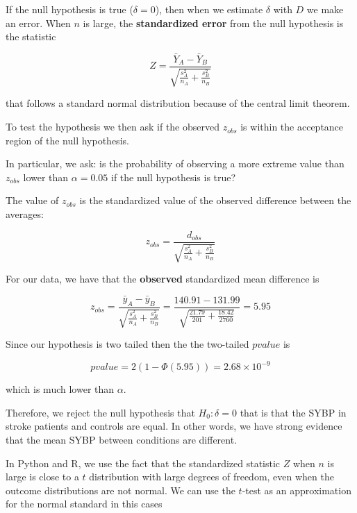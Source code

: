 \documentclass[
]{book}
\begin{document}
If the null hypothesis is true (\(\delta=0\)), then when we estimate \(\delta\) with \(D\) we make an error. When \(n\) is large, the \textbf{standardized error} from the null hypothesis is the statistic

\[Z=\frac{\bar{Y}_A-\bar{Y}_B}{\sqrt{\frac{s_A^2}{n_A}+\frac{s^2_B}{n_B}}}\]

that follows a standard normal distribution because of the central limit theorem.

To test the hypothesis we then ask if the observed \(z_{obs}\) is within the acceptance region of the null hypothesis.

In particular, we ask: is the probability of observing a more extreme value than \(z_{obs}\) lower than \(\alpha=0.05\) if the null hypothesis is true?

The value of \(z_{obs}\) is the standardized value of the observed difference between the averages:

\[z_{obs}=\frac{d_{obs}}{\sqrt{\frac{s_A^2}{n_A}+\frac{s^2_B}{n_B}}}\]

For our data, we have that the \textbf{observed} standardized mean difference is

\[z_{obs}=\frac{\bar{y}_A-\bar{y}_B }{\sqrt{\frac{s^2_A}{n_A}+\frac{s^2_B}{n_B}}}=\frac{140.91-131.99}{\sqrt{\frac{21.79}{201}+\frac{18.42}{2760}}}=5.95\]

Since our hypothesis is two tailed then the the two-tailed \(pvalue\) is

\[pvalue=2(1-\Phi(5.95))=2.68 \times 10^{-9}\]

which is much lower than \(\alpha\).

Therefore, we reject the null hypothesis that \(H_0:\delta=0\) that is that the SYBP in stroke patients and controls are equal. In other words, we have strong evidence that the mean SYBP between conditions are different.

In Python and R, we use the fact that the standardized statistic \(Z\) when \(n\) is large is close to a \(t\) distribution with large degrees of freedom, even when the outcome distributions are not normal. We can use the \(t\)-test as an approximation for the normal standard in this cases
\end{document}
